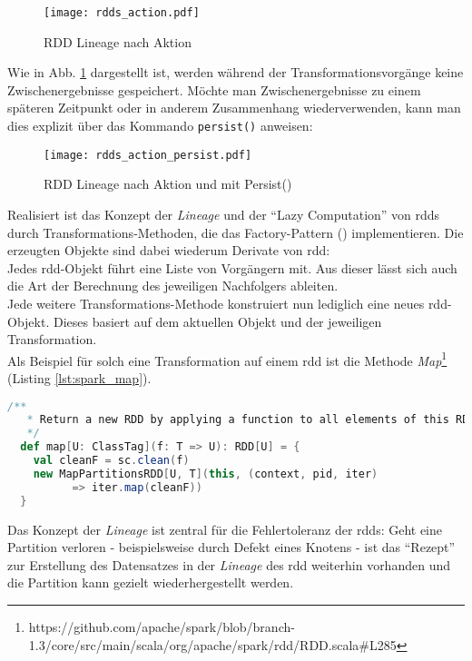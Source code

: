 \begin{figure}[ht!]
	\centering
  \texttt{[image: rdds\_action.pdf]}
	\caption{RDD Lineage nach Aktion}
	\label{fig:rdds_action}
\end{figure}

Wie in Abb. \ref{fig:rdds_action} dargestellt ist, werden während der Transformationsvorgänge keine Zwischenergebnisse gespeichert. Möchte man Zwischenergebnisse zu einem späteren Zeitpunkt oder in anderem Zusammenhang wiederverwenden, kann man dies explizit über das Kommando \lstinline|persist()| anweisen:\\

\begin{figure}[ht!]
	\centering
  \texttt{[image: rdds\_action\_persist.pdf]}
	\caption{RDD Lineage nach Aktion und mit Persist()}
	\label{fig:rdds_action_persist}
\end{figure}

Realisiert ist das Konzept der \textit{Lineage} und der "`Lazy Computation"' von \glspl{rdd} durch Transformations-Methoden, die das Factory-Pattern (\cite{FPP13}) implementieren. Die erzeugten Objekte sind dabei wiederum Derivate von \gls{rdd}:\\
Jedes \gls{rdd}-Objekt führt eine Liste von Vorgängern mit. Aus dieser lässt sich auch die Art der Berechnung des jeweiligen Nachfolgers ableiten.\\
Jede weitere Transformations-Methode konstruiert nun lediglich eine neues \gls{rdd}-Objekt. Dieses basiert auf dem aktuellen Objekt und der jeweiligen Transformation.\\
Als Beispiel für solch eine Transformation auf einem \gls{rdd} ist die Methode \textit{Map}\footnote{https://github.com/apache/spark/blob/branch-1.3/core/src/main/scala/org/apache/spark/rdd/RDD.scala#L285} (Listing \ref{lst:spark_map}).

\begin{lstlisting}[language=Scala,caption={Map-Methode aus org.apache.spark.rdd.RDD v1.3.0},label={lst:spark_map}]
  /**
   * Return a new RDD by applying a function to all elements of this RDD.
   */
  def map[U: ClassTag](f: T => U): RDD[U] = {
    val cleanF = sc.clean(f)
    new MapPartitionsRDD[U, T](this, (context, pid, iter) 
		  => iter.map(cleanF))
  }
\end{lstlisting}



Das Konzept der \textit{Lineage} ist zentral für die Fehlertoleranz der \gls{rdd}s:
Geht eine Partition verloren - beispielsweise durch Defekt eines Knotens - ist das "`Rezept"' zur Erstellung des Datensatzes in der \textit{Lineage} des \gls{rdd} weiterhin vorhanden und die Partition kann gezielt wiederhergestellt werden.\\

